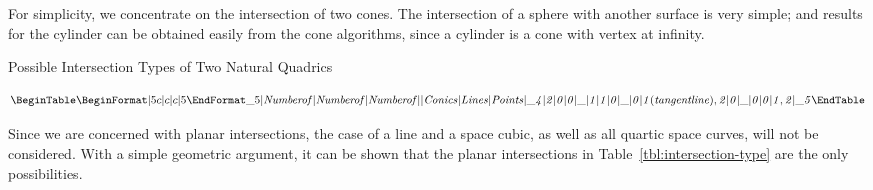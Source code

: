      For simplicity, we concentrate on the intersection of two cones.  The 
intersection of a sphere with another surface is very simple; and results for 
the cylinder can be obtained easily from the cone algorithms, since a cylinder
is a cone with vertex at infinity.  
\begin{table}
\caption{Possible Intersection Types of Two Natural Quadrics}
\label{tbl:intersection-type}
$$
\BeginTable
     \BeginFormat
     |5 c              | c                    | c             |5
     \EndFormat
     \_5
     | \it Number of | \it Number of | \it Number of | \\
     | \it Conics    | \it Lines     | \it Points    | \\ \_4
     |      2        |       0       |       0       | \\ \_
     |      1        |       1       |       0       | \\ \_
     |      0        | 1 (tangent line), 2 | 0       | \\ \_
     |      0        |       0       |      1,2      | \\
     \_5
\EndTable
$$
\end{table}

     Since we are concerned with planar intersections, the case of a line and 
a space cubic, as well as all quartic space curves, will not be considered.  
With a simple geometric argument, it can be shown that the planar intersections
in Table~\ref{tbl:intersection-type} are the only possibilities.

